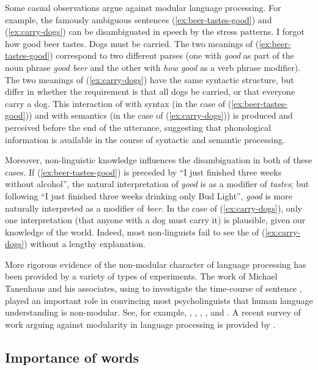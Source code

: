 \documentclass[output=paper
                ,modfonts
                ,nonflat
	        ,collection
	        ,collectionchapter
	        ,collectiontoclongg
 	        ,biblatex
                ,babelshorthands
                ,newtxmath
                ,draftmode
                ,colorlinks, citecolor=brown
]{./langsci/langscibook}
\begin{document}
Some casual observations argue against modular language processing.  For example, the famously ambiguous sentences (\ref{ex:beer-tastes-good}) and (\ref{ex:carry-dogs}) can be disambiguated in speech by the stress patterns.
\eal
\ex I forgot how good beer tastes.\label{ex:beer-tastes-good}
\ex Dogs must be carried.\label{ex:carry-dogs}
\zl
The two meanings of (\ref{ex:beer-tastes-good}) correspond to two different parses (one with \emph{good} as part of the noun phrase \emph{good beer} and the other with \emph{how good} as a verb phrase modifier).  The two meanings of (\ref{ex:carry-dogs}) have the same syntactic structure, but differ in whether the requirement is that all dogs be carried, or that everyone carry a dog.  This interaction of  with syntax (in the case of (\ref{ex:beer-tastes-good})) and with semantics (in the case of (\ref{ex:carry-dogs})) is produced and perceived before the end of the utterance, suggesting that phonological information is available in the course of syntactic and semantic processing.  

Moreover, non-linguistic knowledge influences the disambiguation in both of these cases.  If (\ref{ex:beer-tastes-good}) is preceded by ``I just finished three weeks without alcohol'', the natural interpretation of \emph{good} is as a modifier of \emph{tastes}; but following ``I just finished three weeks drinking only Bud Light'', \emph{good} is more naturally interpreted as a modifier of \emph{beer}.  In the case of (\ref{ex:carry-dogs}), only one interpretation (that anyone with a dog must carry it) is plausible, given our knowledge of the world.  Indeed, most non-linguists fail to see the  of (\ref{ex:carry-dogs}) without a lengthy explanation.  

More rigorous evidence of the non-modular character of language processing has been provided by a variety of types of experiments.  The work of Michael Tanenhaus  and his associates, using  to investigate the time-course of sentence , played an important role in convincing most psycholinguists that human language understanding is non-modular.  See, for example, \citet{EberhardEtal95}, \citet{McMurrayEtal2008}, \citet{TSKES95a}, \citet{TSKES96a}, and \citet{TanenhausTrueswell95}. A recent survey of work arguing against modularity in language processing is provided by \citet{SpevackEtal2018}.  

\subsection{Importance of words}
\label{sec-importance-of-words}
\end{document}
